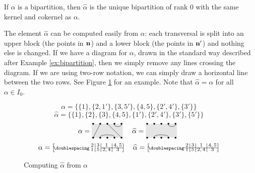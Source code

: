 \begin{definition}
  \label{def:mn-hat}
  If $\alpha$ is a bipartition, then $\widehat\alpha$ is the unique bipartition
  of rank $0$ with the same kernel and cokernel as $\alpha$.
\end{definition}

The element $\widehat\alpha$ can be computed easily from $\alpha$: each
transversal is split into an upper block (the points in $\mathbf{n}$) and a lower block
(the points in $\mathbf{n}'$) and nothing else is changed.  If we have a diagram for
$\alpha$, drawn in the standard way described after Example
\ref{ex:bipartition}, then we simply remove any lines crossing the diagram.  If
we are using two-row notation, we can simply draw a horizontal line between the
two rows.  See Figure \ref{fig:hat} for an example.  Note that $\widehat\alpha =
\alpha$ for all $\alpha \in I_0$.

\begin{figure}[ht]
  \centering
  $$\alpha = \big\{
    \{1\}, \{2,1'\}, \{3,5'\}, \{4,5\}, \{2',4'\}, \{3'\}
  \big\}$$
  $$\widehat\alpha = \big\{
    \{1\}, \{2\}, \{3\}, \{4,5\}, \{1'\}, \{2',4'\}, \{3'\}, \{5'\}
  \big\}$$
  $$\alpha = \bipartdiag{\tv21 \tv35 \tc45 \bc24} \quad
  \widehat\alpha = \bipartdiag{\tc45 \bc24}$$
  $$\alpha = \bipart{c|c|c|c}{3-4}{2 & 3 & 1 & 4,5}{1 & 5 & 2,4 & 3} \quad
  \widehat\alpha = \bipart{c|c|c|c}{1-4}{2 & 3 & 1 & 4,5}{1 & 5 & 2,4 & 3}$$
  \caption{Computing $\widehat\alpha$ from $\alpha$}
  \label{fig:hat}
\end{figure}

